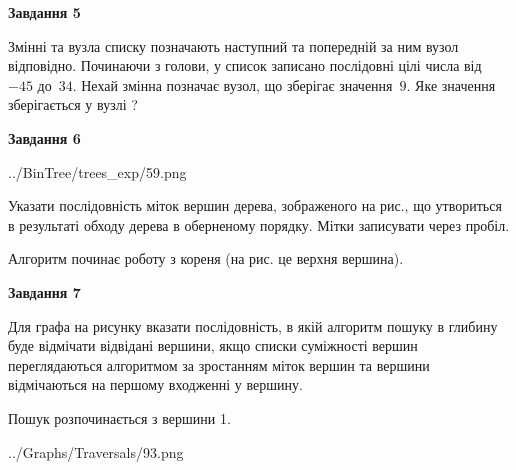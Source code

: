 \documentclass[12pt, ukrainian]{article}
\begin{document}
{\begin {large}
{\begin {center}\textbf{Завдання 5}\end {center}}\par
Змінні  та  вузла списку позначають наступний та попередній за ним вузол відповідно. Починаючи з голови, у список записано послідовні цілі числа від~$-45$ до~$34$. Нехай змінна  позначає вузол, що зберігає значення~$9$.
Яке значення зберігається у вузлі  ?\par
\newpage

{\begin {center}\textbf{Завдання 6}\end {center}}\par

\begin{center}
	{../BinTree/trees_exp/59.png}
\end{center}
Указати послідовність міток вершин дерева, зображеного на рис., що утвориться в результаті обходу дерева в оберненому порядку. Мітки записувати через пробіл.\par Алгоритм починає роботу з кореня (на рис. це верхня вершина).\par
\newpage

{\begin {center}\textbf{Завдання 7}\end {center}}\par
Для графа на рисунку вказати послідовність, в якій алгоритм пошуку в глибину буде відмічати відвідані вершини, якщо списки суміжності вершин переглядаються алгоритмом за зростанням міток вершин та вершини відмічаються на першому вход\-женні у вершину.\par
Пошук розпочинається з вершини 1.\par

\begin{center}
	{../Graphs/Traversals/93.png}
\end{center}\par
\newpage


\end{large}}
\end{document}
